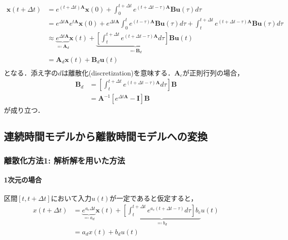 \begin{align}
\mathbf{x}(t+\Delta t)&=e^{(t+\Delta t)\mathbf{A}}\mathbf{x}(0)+\int_0^{t+\Delta t} e^{(t+\Delta t-\tau)\mathbf{A}}\mathbf{B}\mathbf{u}(\tau) d\tau\\
&=e^{\Delta t\mathbf{A}}e^{t\mathbf{A}}\mathbf{x}(0)+e^{\Delta t\mathbf{A}}\int_0^{t} e^{(t-\tau)\mathbf{A}}\mathbf{B}\mathbf{u}(\tau) d\tau + \int_t^{t+\Delta t} e^{(t+\Delta t-\tau)\mathbf{A}}\mathbf{B}\mathbf{u}(\tau) d\tau\\
&\approx \underbrace{e^{\Delta t\mathbf{A}}}_{\eqqcolon \mathbf{A}_d}\mathbf{x}(t)+\underbrace{\left[\int_t^{t+\Delta t} e^{(t+\Delta t-\tau)\mathbf{A}} d\tau\right] \mathbf{B}}_{\eqqcolon \mathbf{B}_d}\mathbf{u}(t)\\
&=\mathbf{A}_d\mathbf{x}(t)+\mathbf{B}_d\mathbf{u}(t)\\
\end{align}
となる．添え字の$d$は離散化(discretization)を意味する．$\mathbf{A}_c$が正則行列の場合，
\begin{align}
\mathbf{B}_d &= \left[\int_t^{t+\Delta t} e^{(t+\Delta t-\tau)\mathbf{A}} d\tau\right] \mathbf{B}\\
&=\mathbf{A}^{-1}\left[e^{\Delta t \mathbf{A}}-\mathbf{I}\right]\mathbf{B}
\end{align}
が成り立つ．
\subsection{連続時間モデルから離散時間モデルへの変換}
\subsubsection{離散化方法1: 解析解を用いた方法}
\paragraph{1次元の場合}
区間$[t, t+\Delta t]$において入力$u(t)$が一定であると仮定すると，
\begin{align}
x(t+\Delta t)&= \underbrace{e^{a_c \Delta t}}_{\eqqcolon a_d}\mathbf{x}(t)+\underbrace{\left[\int_t^{t+\Delta t} e^{a_c(t+\Delta t-\tau)} d\tau\right] b_c}_{\eqqcolon b_d}u(t)\\
&=a_d x(t)+b_d u(t)\\
\end{align}
